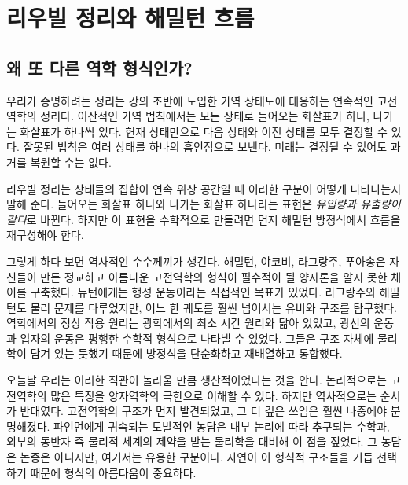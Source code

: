 \chapter{리우빌 정리와 해밀턴 흐름}


\section{왜 또 다른 역학 형식인가?}

우리가 증명하려는 정리는 강의 초반에 도입한 가역 상태도에 대응하는 연속적인 고전역학의 정리다. 이산적인 가역 법칙에서는 모든 상태로 들어오는 화살표가 하나, 나가는 화살표가 하나씩 있다. 현재 상태만으로 다음 상태와 이전 상태를 모두 결정할 수 있다. 잘못된 법칙은 여러 상태를 하나의 흡인점으로 보낸다. 미래는 결정될 수 있어도 과거를 복원할 수는 없다.

리우빌 정리는 상태들의 집합이 연속 위상 공간일 때 이러한 구분이 어떻게 나타나는지 말해 준다. 들어오는 화살표 하나와 나가는 화살표 하나라는 표현은 \emph{유입량과 유출량이 같다}로 바뀐다. 하지만 이 표현을 수학적으로 만들려면 먼저 해밀턴 방정식에서 흐름을 재구성해야 한다.

그렇게 하다 보면 역사적인 수수께끼가 생긴다. 해밀턴, 야코비, 라그랑주, 푸아송은 자신들이 만든 정교하고 아름다운 고전역학의 형식이 필수적이 될 양자론을 알지 못한 채 이를 구축했다. 뉴턴에게는 행성 운동이라는 직접적인 목표가 있었다. 라그랑주와 해밀턴도 물리 문제를 다루었지만, 어느 한 궤도를 훨씬 넘어서는 유비와 구조를 탐구했다. 역학에서의 정상 작용 원리는 광학에서의 최소 시간 원리와 닮아 있었고, 광선의 운동과 입자의 운동은 평행한 수학적 형식으로 나타낼 수 있었다. 그들은 구조 자체에 물리학이 담겨 있는 듯했기 때문에 방정식을 단순화하고 재배열하고 통합했다.

오늘날 우리는 이러한 직관이 놀라울 만큼 생산적이었다는 것을 안다. 논리적으로는 고전역학의 많은 특징을 양자역학의 극한으로 이해할 수 있다. 하지만 역사적으로는 순서가 반대였다. 고전역학의 구조가 먼저 발견되었고, 그 더 깊은 쓰임은 훨씬 나중에야 분명해졌다. 파인먼에게 귀속되는 도발적인 농담은 내부 논리에 따라 추구되는 수학과, 외부의 동반자 즉 물리적 세계의 제약을 받는 물리학을 대비해 이 점을 짚었다. 그 농담은 논증은 아니지만, 여기서는 유용한 구분이다. 자연이 이 형식적 구조들을 거듭 선택하기 때문에 형식의 아름다움이 중요하다.

